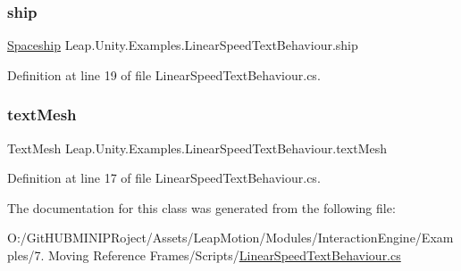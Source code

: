 \subsubsection{\texorpdfstring{ship}{ship}}
{\footnotesize\ttfamily \mbox{\hyperlink{class_leap_1_1_unity_1_1_examples_1_1_spaceship}{Spaceship}} Leap.\+Unity.\+Examples.\+Linear\+Speed\+Text\+Behaviour.\+ship}



Definition at line 19 of file Linear\+Speed\+Text\+Behaviour.\+cs.

\mbox{\label{class_leap_1_1_unity_1_1_examples_1_1_linear_speed_text_behaviour_aa5acda2812bdb43d630e2a7d40477282}} 
\subsubsection{\texorpdfstring{textMesh}{textMesh}}
{\footnotesize\ttfamily Text\+Mesh Leap.\+Unity.\+Examples.\+Linear\+Speed\+Text\+Behaviour.\+text\+Mesh}



Definition at line 17 of file Linear\+Speed\+Text\+Behaviour.\+cs.



The documentation for this class was generated from the following file\+:\begin{DoxyCompactItemize}
\item 
O\+:/\+Git\+H\+U\+B\+M\+I\+N\+I\+P\+Roject/\+Assets/\+Leap\+Motion/\+Modules/\+Interaction\+Engine/\+Examples/7. Moving Reference Frames/\+Scripts/\mbox{\hyperlink{_linear_speed_text_behaviour_8cs}{Linear\+Speed\+Text\+Behaviour.\+cs}}\end{DoxyCompactItemize}
